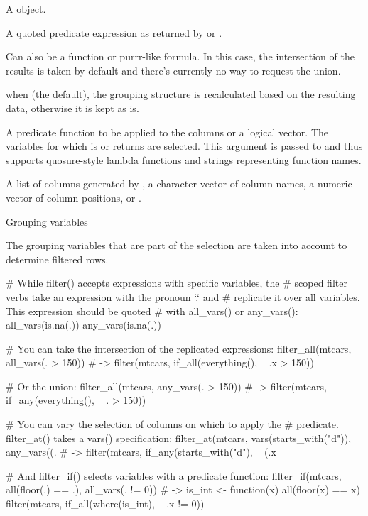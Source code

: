 \documentclass[a4paper]{book}
\begin{document}
\begin{Arguments}
\begin{ldescription}
\item[\code{.tbl}] A  object.

\item[\code{.vars\_predicate}] A quoted predicate expression as returned by
 or .

Can also be a function or purrr-like formula. In this case, the
intersection of the results is taken by default and there's
currently no way to request the union.

\item[\code{.preserve}] when  (the default), the grouping structure
is recalculated based on the resulting data, otherwise it is kept as is.

\item[\code{.predicate}] A predicate function to be applied to the columns
or a logical vector. The variables for which  is or
returns  are selected. This argument is passed to
 and thus supports quosure-style lambda
functions and strings representing function names.

\item[\code{.vars}] A list of columns generated by ,
a character vector of column names, a numeric vector of column
positions, or .
\end{ldescription}
\end{Arguments}
%
\begin{Section}{Grouping variables}


The grouping variables that are part of the selection are taken
into account to determine filtered rows.
\end{Section}
%
\begin{Examples}
\begin{ExampleCode}
# While filter() accepts expressions with specific variables, the
# scoped filter verbs take an expression with the pronoun `.` and
# replicate it over all variables. This expression should be quoted
# with all_vars() or any_vars():
all_vars(is.na(.))
any_vars(is.na(.))


# You can take the intersection of the replicated expressions:
filter_all(mtcars, all_vars(. > 150))
# ->
filter(mtcars, if_all(everything(), ~ .x > 150))

# Or the union:
filter_all(mtcars, any_vars(. > 150))
# ->
filter(mtcars, if_any(everything(), ~ . > 150))


# You can vary the selection of columns on which to apply the
# predicate. filter_at() takes a vars() specification:
filter_at(mtcars, vars(starts_with("d")), any_vars((. %
# ->
filter(mtcars, if_any(starts_with("d"), ~ (.x %

# And filter_if() selects variables with a predicate function:
filter_if(mtcars, ~ all(floor(.) == .), all_vars(. != 0))
# ->
is_int <- function(x) all(floor(x) == x)
filter(mtcars, if_all(where(is_int), ~ .x != 0))
\end{ExampleCode}
\end{Examples}
\end{document}
